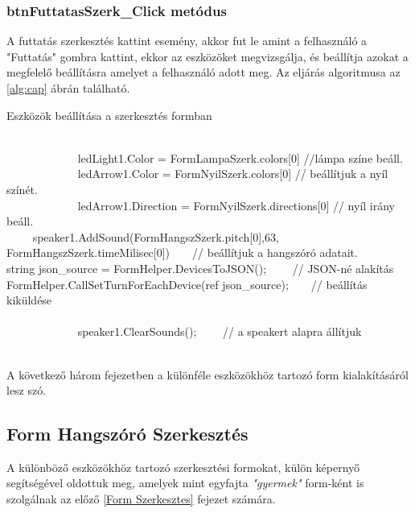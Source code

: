 \documentclass[tocnopagenum]{thesis-ekf}
\theoremstyle{definition}
\theoremstyle{remark}
\begin{document}
	\subsubsection{btnFuttatasSzerk\_Click metódus}
	A futtatás szerkesztés kattint esemény, akkor fut le amint a felhasználó a "Futtatás" gombra kattint, ekkor az eszközöket megvizsgálja, és beállítja azokat a megfelelő beállításra amelyet a felhasználó adott meg. Az eljárás algoritmusa az \ref{alg:cap} ábrán található.
	\begin{algorithm}
		\caption{Eszközök beállítása a szerkesztés formban}\label{alg:cap}
		\begin{algorithmic}
				\\
				$\qquad \qquad \qquad $ ledLight1.Color = FormLampaSzerk.colors[0] //lámpa színe beáll.
				\EndIf
					\\
				$\qquad \qquad  \qquad $ ledArrow1.Color = FormNyilSzerk.colors[0] // beállítjuk a nyíl színét.
				\\
				$\qquad \qquad  \qquad $  ledArrow1.Direction = FormNyilSzerk.directions[0] // nyíl irány beáll.
				\EndIf
					\\
				$\qquad $ speaker1.AddSound(FormHangszSzerk.pitch[0],63, FormHangszSzerk.timeMilisec[0])$\qquad $// beállítjuk a hangszóró adatait.
				\EndIf
				\\
				 string json\_source = FormHelper.DevicesToJSON(); $\qquad $// JSON-né alakítás
				 \\
				  FormHelper.CallSetTurnForEachDevice(ref json\_source);$\qquad $// beállítás kiküldése
				 \\
				 \\
				 $\qquad \qquad  \qquad $ 
				 speaker1.ClearSounds(); $\qquad $// a speakert alapra állítjuk
				 \EndIf
			\EndProcedure
		\end{algorithmic}
	\end{algorithm}
\\
	A következő három fejezetben a különféle eszközökhöz tartozó form kialakításáról lesz szó.

	\subsection{Form Hangszóró Szerkesztés}
	A különböző eszközökhöz tartozó szerkesztési formokat, külön képernyő segítségével oldottuk meg, amelyek mint egyfajta \textit{"gyermek"} form-ként is szolgálnak az előző \ref{Form Szerkesztes} fejezet számára. 
	
\end{document}
